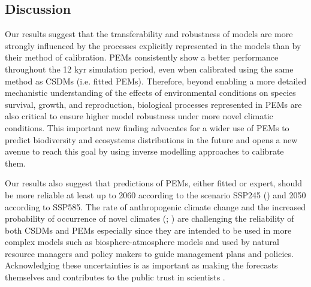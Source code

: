 \subsection{Discussion}\label{disc}

Our results suggest that the transferability and robustness of models are more strongly influenced by the processes explicitly represented in the models than by their method of calibration. PEMs consistently show a better performance throughout the 12 kyr simulation period, even when calibrated using the same method as CSDMs (i.e. fitted PEMs). Therefore, beyond enabling a more detailed mechanistic understanding of the effects of environmental conditions on species survival, growth, and reproduction, biological processes represented in PEMs are also critical to ensure higher model robustness under more novel climatic conditions. This important new finding advocates for a wider use of PEMs to predict biodiversity and ecosystems distributions in the future and opens a new avenue to reach this goal by using inverse modelling approaches to calibrate them.

Our results also suggest that predictions of PEMs, either fitted or expert, should be more reliable at least up to 2060 according to the scenario SSP245 () and 2050 according to SSP585. The rate of anthropogenic climate change and the increased probability of occurrence of novel climates (; \citealp{Williams2007}) are challenging the reliability of both CSDMs and PEMs especially since they are intended to be used in more complex models such as biosphere-atmosphere models and used by natural resource managers and policy makers to guide management plans and policies. Acknowledging these uncertainties is as important as making the forecasts themselves \citep{Beale2012} and contributes to the public trust in scientists \citep{Berkhout2010}.

